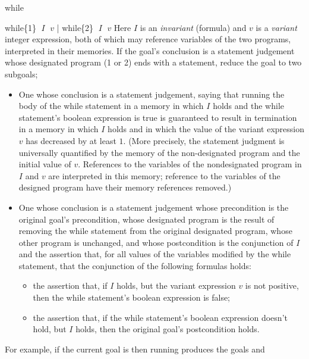 \begin{tactic}{while}
  \begin{tsyntax}{while\{1\} $\;I$ $\;v$ | while\{2\} $\;I$ $\;v$}
    Here $I$ is an \emph{invariant} (formula) and $v$ is a
    \emph{variant} integer expression, both of which may reference
    variables of the two programs, interpreted in their memories.  If
    the goal's conclusion is a \prhl statement judgement whose
    designated program (1 or 2) ends with a  statement,
    reduce the goal to two subgoals;
    \begin{itemize}
    \item One whose conclusion is a \phl statement judgement, saying that
      running the body of the while statement in a memory in which
      $I$ holds and the while statement's boolean expression is true
      is guaranteed to result in termination in a memory in which
      $I$ holds and in which the value of the variant expression $v$
      has decreased by at least $1$. (More precisely, the \phl statement
      judgment is universally quantified by the memory of the non-designated
      program and the initial value of $v$. References to the variables
      of the nondesignated program in $I$ and $v$ are interpreted in this
      memory; reference to the variables of the designed program have
      their memory references removed.)

    \item One whose conclusion is a \prhl statement judgement whose
      precondition is the original goal's precondition, whose
      designated program is the result of removing the while statement
      from the original designated program, whose other program is
      unchanged, and whose postcondition is the conjunction of $I$ and
      the assertion that, for all values of the variables modified by
      the while statement, that the conjunction of the following
      formulas holds:
      \begin{itemize}
      \item the assertion that, if $I$ holds, but the variant
        expression $v$ is not positive, then the while statement's
        boolean expression is false;

      \item the assertion that, if the while statement's boolean expression
        doesn't hold, but $I$ holds, then the original goal's postcondition
        holds.
      \end{itemize}
    \end{itemize}

  \bigskip
  For example, if the current goal is
   then
  running 
  produces the goals
  and
  \end{tsyntax}


\end{tactic}
